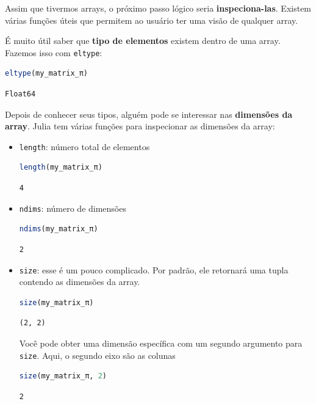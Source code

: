 \documentclass[
  notoc %
]{tufte-book}
\newcommand{\passthrough}[1]{#1}
\begin{document}
Assim que tivermos arrays, o próximo passo lógico seria
\textbf{inspeciona-las}. Existem várias funções úteis que permitem ao
usuário ter uma visão de qualquer array.

É muito útil saber que \textbf{tipo de elementos} existem dentro de uma
array. Fazemos isso com \passthrough{\lstinline!eltype!}:

\begin{lstlisting}[language=Julia]
eltype(my_matrix_π)
\end{lstlisting}

\begin{lstlisting}[language=Output]
Float64
\end{lstlisting}

Depois de conhecer seus tipos, alguém pode se interessar nas
\textbf{dimensões da array}. Julia tem várias funções para inspecionar
as dimensões da array:

\begin{itemize}
\item
  \passthrough{\lstinline!length!}: número total de elementos

  \begin{lstlisting}[language=Julia]
  length(my_matrix_π)
  \end{lstlisting}

  \begin{lstlisting}[language=Output]
  4
  \end{lstlisting}
\item
  \passthrough{\lstinline!ndims!}: número de dimensões

  \begin{lstlisting}[language=Julia]
  ndims(my_matrix_π)
  \end{lstlisting}

  \begin{lstlisting}[language=Output]
  2
  \end{lstlisting}
\item
  \passthrough{\lstinline!size!}: esse é um pouco complicado. Por
  padrão, ele retornará uma tupla contendo as dimensões da array.

  \begin{lstlisting}[language=Julia]
  size(my_matrix_π)
  \end{lstlisting}

  \begin{lstlisting}[language=Output]
  (2, 2)
  \end{lstlisting}

  Você pode obter uma dimensão específica com um segundo argumento para
  \passthrough{\lstinline!size!}. Aqui, o segundo eixo são as colunas

  \begin{lstlisting}[language=Julia]
  size(my_matrix_π, 2)
  \end{lstlisting}

  \begin{lstlisting}[language=Output]
  2
  \end{lstlisting}
\end{itemize}
\end{document}
